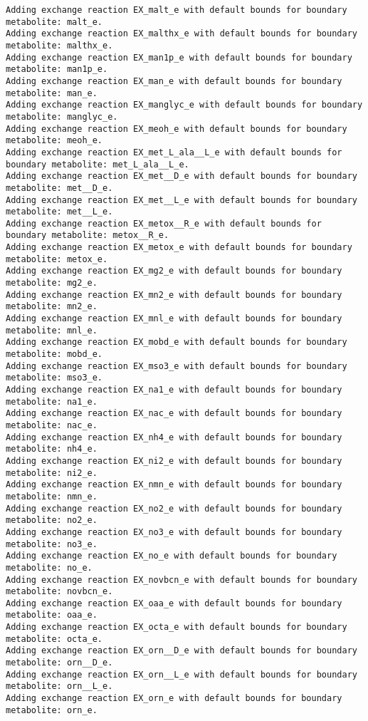 \documentclass[
  letterpaper,
  DIV=11,
  numbers=noendperiod]{scrartcl}
\begin{document}
\begin{verbatim}
Adding exchange reaction EX_malt_e with default bounds for boundary metabolite: malt_e.
Adding exchange reaction EX_malthx_e with default bounds for boundary metabolite: malthx_e.
Adding exchange reaction EX_man1p_e with default bounds for boundary metabolite: man1p_e.
Adding exchange reaction EX_man_e with default bounds for boundary metabolite: man_e.
Adding exchange reaction EX_manglyc_e with default bounds for boundary metabolite: manglyc_e.
Adding exchange reaction EX_meoh_e with default bounds for boundary metabolite: meoh_e.
Adding exchange reaction EX_met_L_ala__L_e with default bounds for boundary metabolite: met_L_ala__L_e.
Adding exchange reaction EX_met__D_e with default bounds for boundary metabolite: met__D_e.
Adding exchange reaction EX_met__L_e with default bounds for boundary metabolite: met__L_e.
Adding exchange reaction EX_metox__R_e with default bounds for boundary metabolite: metox__R_e.
Adding exchange reaction EX_metox_e with default bounds for boundary metabolite: metox_e.
Adding exchange reaction EX_mg2_e with default bounds for boundary metabolite: mg2_e.
Adding exchange reaction EX_mn2_e with default bounds for boundary metabolite: mn2_e.
Adding exchange reaction EX_mnl_e with default bounds for boundary metabolite: mnl_e.
Adding exchange reaction EX_mobd_e with default bounds for boundary metabolite: mobd_e.
Adding exchange reaction EX_mso3_e with default bounds for boundary metabolite: mso3_e.
Adding exchange reaction EX_na1_e with default bounds for boundary metabolite: na1_e.
Adding exchange reaction EX_nac_e with default bounds for boundary metabolite: nac_e.
Adding exchange reaction EX_nh4_e with default bounds for boundary metabolite: nh4_e.
Adding exchange reaction EX_ni2_e with default bounds for boundary metabolite: ni2_e.
Adding exchange reaction EX_nmn_e with default bounds for boundary metabolite: nmn_e.
Adding exchange reaction EX_no2_e with default bounds for boundary metabolite: no2_e.
Adding exchange reaction EX_no3_e with default bounds for boundary metabolite: no3_e.
Adding exchange reaction EX_no_e with default bounds for boundary metabolite: no_e.
Adding exchange reaction EX_novbcn_e with default bounds for boundary metabolite: novbcn_e.
Adding exchange reaction EX_oaa_e with default bounds for boundary metabolite: oaa_e.
Adding exchange reaction EX_octa_e with default bounds for boundary metabolite: octa_e.
Adding exchange reaction EX_orn__D_e with default bounds for boundary metabolite: orn__D_e.
Adding exchange reaction EX_orn__L_e with default bounds for boundary metabolite: orn__L_e.
Adding exchange reaction EX_orn_e with default bounds for boundary metabolite: orn_e.

\end{verbatim}
\end{document}
